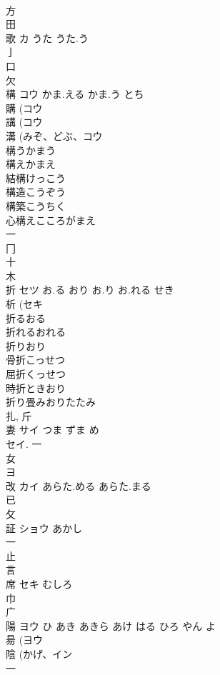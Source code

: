 \documentclass[8pt]{extreport}
\begin{document}
\begin{CJK}{UTF8}{min}
\\	方 
\\	田 
\\	歌	カ	うた うた.う	
\\	亅 
\\	口 
\\	欠 
\\	構	コウ	かま.える かま.う とち	
\\	購 (コウ 
\\	講 (コウ 
\\	溝 (みぞ、どぶ、コウ 
\\	構うかまう
\\	構えかまえ
\\	結構けっこう
\\	構造こうぞう
\\	構築こうちく
\\	心構えこころがまえ
\\	一 
\\	冂 
\\	十 
\\	木 
\\	折	セツ	お.る おり お.り お.れる せき	
\\	析 (セキ 
\\	折るおる
\\	折れるおれる
\\	折りおり
\\	骨折こっせつ
\\	屈折くっせつ
\\	時折ときおり
\\	折り畳みおりたたみ
\\	扎, 斤 
\\	妻	サイ	つま ずま め	
\\	セイ.			一 
\\	女 
\\	ヨ	
\\	改	カイ	あらた.める あらた.まる	
\\	已 
\\	攵 
\\	証	ショウ	あかし	
\\	一 
\\	止 
\\	言 
\\	席	セキ	むしろ	
\\	巾 
\\	广 
\\	陽	ヨウ	ひ あき あきら あけ はる ひろ やん よ	
\\	昜 (ヨウ 
\\	陰 (かげ、イン 
\\	一 

\end{CJK}
\end{document}
